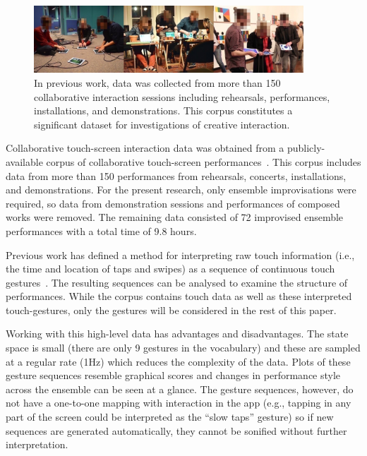 \documentclass{article}
\begin{document}
\begin{figure}
  \centering
  \includegraphics[width=0.9\textwidth]{three-performance-contexts}
  \caption{In previous work, data was collected from more than 150
    collaborative interaction sessions including rehearsals,
    performances, installations, and demonstrations. This corpus
    constitutes a significant dataset for investigations of
    creative interaction.}\label{fig:performance-contexts}
\end{figure}

Collaborative touch-screen interaction data was obtained from a
publicly-available corpus of collaborative touch-screen
performances~\cite{Martin:2016fc}. This corpus includes data from more
than 150 performances from rehearsals, concerts,
installations, and demonstrations. For the present research, only
ensemble improvisations were required, so data from demonstration
sessions and performances of composed works were removed. The
remaining data consisted of 72 improvised ensemble performances with a
total time of 9.8 hours.

Previous work has defined a method for interpreting raw touch
information (i.e., the time and location of taps and swipes) as a
sequence of continuous touch gestures~\cite{Martin:2015jk}. The
resulting sequences can be analysed to examine the structure of
performances. While the corpus contains touch data as well as these
interpreted touch-gestures, only the gestures will be considered in
the rest of this paper.

Working with this high-level data has advantages and disadvantages.
The state space is small (there are only 9 gestures in the vocabulary)
and these are sampled at a regular rate (1Hz) which reduces the
complexity of the data. Plots of these gesture sequences resemble
graphical scores and changes in performance style across the ensemble
can be seen at a glance. The gesture sequences, however, do not have a
one-to-one mapping with interaction in the app (e.g., tapping in any
part of the screen could be interpreted as the ``slow taps'' gesture)
so if new sequences are generated automatically, they cannot be
sonified without further interpretation.
\end{document}
